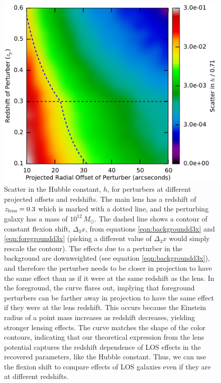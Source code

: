 \documentclass{emulateapj}
\begin{document}
\begin{figure}[t]
\begin{center}
\includegraphics[width=\columnwidth]{toyh.pdf}
\caption{\label{fig:toyhd3x} Scatter in the Hubble constant, $h$, for perturbers at different projected offsets and redshifts.  The main lens has a redshift of $z_{\rm{lens}} = 0.3$ which is marked with a dotted line, and the perturbing galaxy has a mass of $10^{12}\,M_\odot$.  The dashed line shows a contour of constant flexion shift, $\Delta_3 x$, from equations \ref{eqn:backgroundd3x} and \ref{eqn:foregroundd3x} (picking a different value of $\Delta_3 x$ would simply rescale the contour). The effects due to a perturber in the background are downweighted (see equation \ref{eqn:backgroundd3x}), and therefore the perturber needs to be closer in projection to have the same effect than as if it were at the same redshift as the lens. In the foreground, the curve flares out, implying that foreground perturbers can be farther away in projection to have the same effect if they were at the lens redshift. This occurs because the Einstein radius of a point mass increases as redshift decreases, yielding stronger lensing effects. The curve matches the shape of the color contours, indicating that our theoretical expression from the lens potential captures the redshift dependence of LOS effects in the recovered parameters, like the Hubble constant.  Thus, we can use the flexion shift to compare effects of LOS galaxies even if they are at different redshifts.
}
\end{center}
\end{figure}
\end{document}
